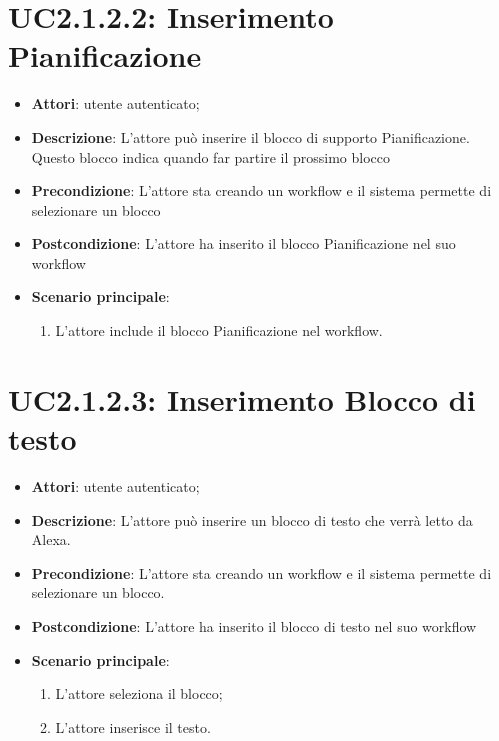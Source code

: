 \section{UC2.1.2.2: Inserimento Pianificazione}
\label{UC2.1.2.2}
\begin{itemize}
	\item \textbf{Attori}: utente autenticato;
	\item \textbf{Descrizione}: L'attore può inserire il blocco di supporto Pianificazione. Questo blocco indica quando far partire il prossimo blocco
	\item \textbf{Precondizione}: L'attore sta creando un workflow e il sistema permette di selezionare un blocco
	\item \textbf{Postcondizione}: L'attore ha inserito il blocco Pianificazione nel suo workflow
	\item \textbf{Scenario principale}:
	\begin{enumerate} \item L'attore include il blocco Pianificazione nel workflow.\end{enumerate}
\end{itemize}

\section{UC2.1.2.3: Inserimento Blocco di testo}
\label{UC2.1.2.3}
\begin{itemize}
	\item \textbf{Attori}: utente autenticato;
	\item \textbf{Descrizione}: L'attore può inserire un blocco di testo che verrà letto da Alexa.
	\item \textbf{Precondizione}: L'attore sta creando un workflow e il sistema permette di selezionare un blocco.
	\item \textbf{Postcondizione}: L'attore ha inserito il blocco di testo nel suo workflow
	\item \textbf{Scenario principale}:
	\begin{enumerate} \item L'attore seleziona il blocco;  \item  L'attore inserisce il testo.\end{enumerate}
\end{itemize}

